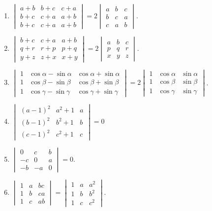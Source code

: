 \begin{enumerate}[resume]
\item $\begin{vmatrix}a + b & b + c & c + a\\b + c & c + a & a + b\\b + c & c + a & a + b\end{vmatrix} = 2\begin{vmatrix}a & b &
  c\\b & c & a\\ c & a & b\end{vmatrix}$.
\item $\begin{vmatrix}b + c & c + a & a + b\\q + r & r + p & p + q \\ y + z &  z + x & x + y\end{vmatrix} = 2\begin{vmatrix}a & b
  & c\\p & q & r\\x & y & z\end{vmatrix}$.
\item $\begin{vmatrix}1 & \cos\alpha - \sin\alpha & \cos\alpha + \sin\alpha\\ 1 & \cos\beta - \sin\beta & \cos\beta +
  \sin\beta\\ 1 & \cos\gamma - \sin\gamma & \cos\gamma + \sin\gamma\end{vmatrix} = 2\begin{vmatrix}1 & \cos\alpha & \sin\alpha\\1
  & \cos\beta & \sin\beta\\1 & \cos\gamma & \sin\gamma\end{vmatrix}$.
\item $\begin{vmatrix}(a - 1)^2 & a^2 + 1 & a\\(b - 1)^2 & b^2 + 1 & b\\(c - 1)^2 & c^2 + 1 & c\end{vmatrix} = 0$
\item $\begin{vmatrix}0 & c & b\\ -c & 0 & a\\ - b & -a & 0\end{vmatrix} = 0$.
\item $\begin{vmatrix}1 & a & bc\\ 1 & b & ca\\ 1 & c & ab\end{vmatrix} = \begin{vmatrix}1 & a & a^2\\1 & b & b^2\\ 1 & c & c^2\end{vmatrix}$.

\end{enumerate}
